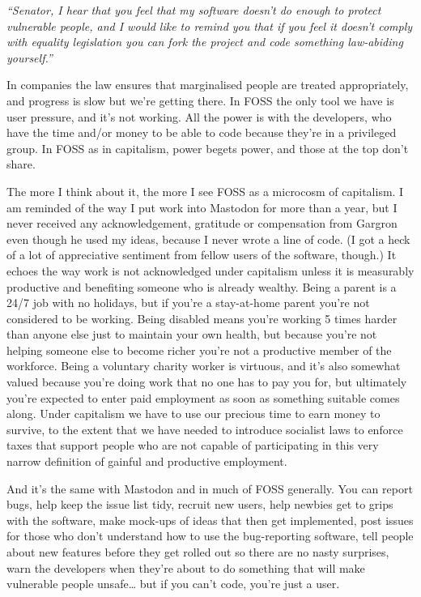 \documentclass[10pt]{article}
\begin{document}
\begin{multicols}{2}
\emph{
    “Senator, I hear that you feel that my software doesn’t do enough to protect vulnerable people, and I would like to remind you that if you feel it doesn’t comply with equality legislation you can fork the project and code something law-abiding yourself.”
}

In companies the law ensures that marginalised people are treated appropriately, and progress is slow but we’re getting there. In FOSS the only tool we have is user pressure, and it’s not working. All the power is with the developers, who have the time and/or money to be able to code because they’re in a privileged group. In FOSS as in capitalism, power begets power, and those at the top don’t share.

The more I think about it, the more I see FOSS as a microcosm of capitalism. I am reminded of the way I put work into Mastodon for more than a year, but I never received any acknowledgement, gratitude or compensation from Gargron even though he used my ideas, because I never wrote a line of code. (I got a heck of a lot of appreciative sentiment from fellow users of the software, though.) It echoes the way work is not acknowledged under capitalism unless it is measurably productive and benefiting someone who is already wealthy. Being a parent is a 24/7 job with no holidays, but if you’re a stay-at-home parent you’re not considered to be working. Being disabled means you’re working 5 times harder than anyone else just to maintain your own health, but because you’re not helping someone else to become richer you’re not a productive member of the workforce. Being a voluntary charity worker is virtuous, and it’s also somewhat valued because you’re doing work that no one has to pay you for, but ultimately you’re expected to enter paid employment as soon as something suitable comes along. Under capitalism we have to use our precious time to earn money to survive, to the extent that we have needed to introduce socialist laws to enforce taxes that support people who are not capable of participating in this very narrow definition of gainful and productive employment.

And it’s the same with Mastodon and in much of FOSS generally. You can report bugs, help keep the issue list tidy, recruit new users, help newbies get to grips with the software, make mock-ups of ideas that then get implemented, post issues for those who don’t understand how to use the bug-reporting software, tell people about new features before they get rolled out so there are no nasty surprises, warn the developers when they’re about to do something that will make vulnerable people unsafe… but if you can’t code, you’re just a user.


\end{multicols}
\end{document}
